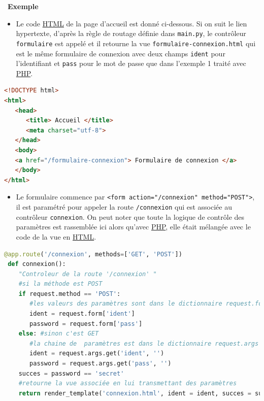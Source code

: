 \documentclass[
  11pt,
]{article}
\newcommand{\passthrough}[1]{#1}
\providecommand{\tightlist}{%
  \setlength{\itemsep}{0pt}\setlength{\parskip}{0pt}}
\newcounter{def}
\newcounter{exple}
\newenvironment{exemple}[1]
{\par \medskip   \addtocounter{exple}{1} \noindent  
\begin{bclogo}[arrondi =0.1,   noborder = true, logo=\bclampe, marge=4]{~\textbf{Exemple} \textbf{\theexple} {\itshape #1} }  \par}
{
\end{bclogo}
 \par \bigskip }
\newcounter{logi}
\begin{document}
\begin{exemple}{}
\begin{enumerate}
\begin{itemize}
    \begin{itemize}
    \tightlist
    \item
      Le code
      \href{https://developer.mozilla.org/fr/docs/Glossaire/HTML}{HTML}
      de la page d'accueil est donné ci-dessous. Si on suit le lien
      hypertexte, d'après la règle de routage définie dans
      \passthrough{\lstinline!main.py!}, le contrôleur
      \passthrough{\lstinline!formulaire!} est appelé et il retourne la
      vue \passthrough{\lstinline!formulaire-connexion.html!} qui est le
      même formulaire de connexion avec deux champs
      \passthrough{\lstinline!ident!} pour l'identifiant et
      \passthrough{\lstinline!pass!} pour le mot de passe que dans
      l'exemple 1 traité avec
      \href{https://developer.mozilla.org/fr/docs/Glossaire/PHP}{PHP}.
    \end{itemize}

\begin{lstlisting}[language=HTML]
<!DOCTYPE html>
<html>
   <head>
      <title> Accueil </title>
      <meta charset="utf-8">
   </head>         
   <body> 
   <a href="/formulaire-connexion"> Formulaire de connexion </a>
   </body>
</html> 
\end{lstlisting}

    \begin{itemize}
    \tightlist
    \item
      Le formulaire commence par
      \passthrough{\lstinline!<form action="/connexion" method="POST">!},
      il est paramétré pour appeler la route
      \passthrough{\lstinline!/connexion!} qui est associée au
      contrôleur \passthrough{\lstinline!connexion!}. On peut noter que
      toute la logique de contrôle des paramètres est rassemblée ici
      alors qu'avec
      \href{https://developer.mozilla.org/fr/docs/Glossaire/PHP}{PHP},
      elle était mélangée avec le code de la vue en
      \href{https://developer.mozilla.org/fr/docs/Glossaire/HTML}{HTML}.
    \end{itemize}

\begin{lstlisting}[language=Python]
 @app.route('/connexion', methods=['GET', 'POST'])
 def connexion():
    "Controleur de la route '/connexion' "
    #si la méthode est POST
    if request.method == 'POST':
       #les valeurs des paramètres sont dans le dictionnaire request.form 
       ident = request.form['ident']
       password = request.form['pass']    
    else: #sinon c'est GET
       #la chaine de  paramètres est dans le dictionnaire request.args
       ident = request.args.get('ident', '') 
       password = request.args.get('pass', '')
    succes = password == 'secret'
    #retourne la vue associée en lui transmettant des paramètres
    return render_template('connexion.html', ident = ident, succes = succes)
\end{lstlisting}


\end{itemize}
\end{enumerate}
\end{exemple}
\end{document}
